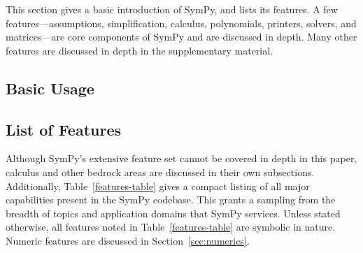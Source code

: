 This section gives a basic introduction of SymPy, and lists its features.
A few features---assumptions, simplification, calculus, polynomials, printers,
solvers, and matrices---are core components of SymPy and are discussed in
depth. Many other features are discussed in depth in the supplementary
material.

\subsection{Basic Usage}
\label{sec:basic-usage}


\subsection{List of Features}

Although SymPy's extensive feature set cannot be covered in depth in this
paper, calculus and other bedrock areas are discussed in their own
subsections. Additionally, Table~\ref{features-table} gives a compact listing
of all major capabilities present in the SymPy codebase. This grants a
sampling from the breadth of topics and application domains that SymPy
services. Unless stated otherwise, all features noted in
Table~\ref{features-table} are symbolic in nature. Numeric features are
discussed in Section~\ref{sec:numerics}.

